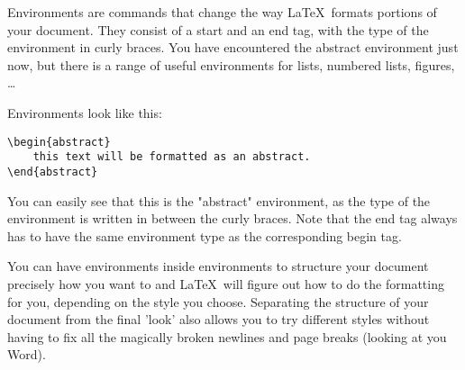 Environments are commands that change the way \LaTeX~formats portions of your document. They consist of a start and an end tag, with the type of the environment in curly braces. You have encountered the abstract environment just now, but there is a range of useful environments for lists, numbered lists, figures, \dots

Environments look like this:\\

\begin{verbatim}
\begin{abstract} 
    this text will be formatted as an abstract.
\end{abstract}
\end{verbatim}

You can easily see that this is the "abstract" environment, as the type of the environment is written in between the curly braces. Note that the end tag always has to have the same environment type as the corresponding begin tag.

You can have environments inside environments to structure your document precisely how you want to and \LaTeX~will figure out how to do the formatting for you, depending on the style you choose.
Separating the structure of your document from the final 'look' also allows you to try different styles without having to fix all the magically broken newlines and page breaks (looking at you Word).